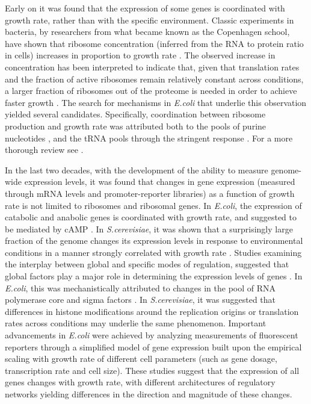 \documentclass[a4paper]{article}
\begin{document}
Early on it was found that the expression of some genes is coordinated with growth rate, rather than with the specific environment.
Classic experiments in bacteria, by researchers from what became known as the Copenhagen school, have shown that ribosome concentration (inferred from the RNA to protein ratio in cells) increases in proportion to growth rate \cite{Schaechter1958}.
The observed increase in concentration has been interpreted to indicate that, given that translation rates and the fraction of active ribosomes remain relatively constant across conditions, a larger fraction of ribosomes out of the proteome is needed in order to achieve faster growth \cite{Neidhardt1999,Dennis2004,Zaslaver2009}. The search for mechanisms in \emph{E.coli} that underlie this observation yielded several candidates.
Specifically, coordination between ribosome production and growth rate was attributed both to the pools of purine nucleotides \cite{Gourse1996,Gaal1997}, and the tRNA pools through the stringent response \cite{Chatterji2001,Brauer2008a}.
For a more thorough review see \cite{Nomura1984}.

In the last two decades, with the development of the ability to measure genome-wide expression levels, it was found that changes in gene expression (measured through mRNA levels and promoter-reporter libraries) as a function of growth rate is not limited to ribosomes and ribosomal genes.
In \emph{E.coli}, the expression of catabolic and anabolic genes is coordinated with growth rate, and suggested to be mediated by cAMP \cite{Saldanha2004}.
In \emph{S.cerevisiae}, it was shown that a surprisingly large fraction of the genome changes its expression levels in response to environmental conditions in a manner strongly correlated with growth rate \cite{Keren2013a,Gasch2000,Castrillo2007,Gerosa2013}.
Studies examining the interplay between global and specific modes of regulation, suggested that global factors play a major role in determining the expression levels of genes \cite{Gasch2000,Klumpp2009a,Scott2010,Berthoumieux2013,Keren2013a,Gerosa2013}.
In \emph{E.coli}, this was mechanistically attributed to changes in the pool of RNA polymerase core and sigma factors \cite{Klumpp2008}.
In \emph{S.cerevisiae}, it was suggested that differences in histone modifications around the replication origins \cite{Regenberg2006} or translation rates \cite{Gasch2000} across conditions may underlie the same phenomenon.
Important advancements in \emph{E.coli} were achieved by analyzing measurements of fluorescent reporters through a simplified model of gene expression built upon the empirical scaling with growth rate of different cell parameters (such as gene dosage, transcription rate and cell size)\cite{Klumpp2009a}.
These studies suggest that the expression of all genes changes with growth rate, with different architectures of regulatory networks yielding differences in the direction and magnitude of these changes. 
\end{document}
